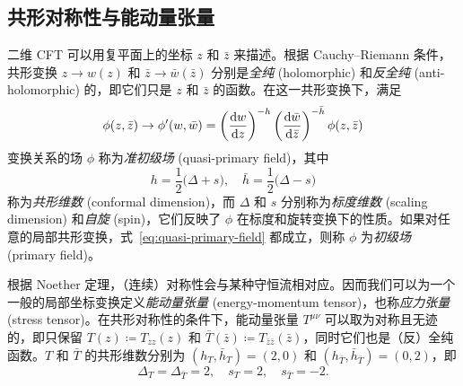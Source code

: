 \subsection{共形对称性与能动量张量}

二维 CFT 可以用复平面上的坐标 $z$ 和 $\bar{z}$ 来描述。根据 Cauchy--Riemann 条件，共形变换 $z\to w(z)$ 和 $\bar{z}\to\bar{w}(\bar{z})$ 分别是\emph{全纯} (holomorphic) 和\emph{反全纯} (anti-holomorphic) 的，即它们只是 $z$ 和 $\bar{z}$ 的函数。在这一共形变换下，满足
\begin{equation}
  \phi(z,\bar{z}) \to \phi'(w,\bar{w}) =
  \left( \frac{\mathrm{d}w}{\mathrm{d}z} \right)^{-h} \left( \frac{\mathrm{d}\bar{w}}{\mathrm{d}\bar{z}} \right)^{-\bar{h}} \phi(z,\bar{z})
  \label{eq:quasi-primary-field}
\end{equation}
变换关系的场 $\phi$ 称为\emph{准初级场} (quasi-primary field)，其中
\begin{equation}
  h = \frac12 \bigl( \Delta+s \bigr), \quad \bar{h} = \frac12 \bigl( \Delta-s \bigr)
\end{equation}
称为\emph{共形维数} (conformal dimension)，而 $\Delta$ 和 $s$ 分别称为\emph{标度维数} (scaling dimension) 和\emph{自旋} (spin)，它们反映了 $\phi$ 在标度和旋转变换下的性质。如果对任意的局部共形变换，式~\eqref{eq:quasi-primary-field} 都成立，则称 $\phi$ 为\emph{初级场} (primary field)。

根据 Noether 定理，（连续）对称性会与某种守恒流相对应。因而我们可以为一个一般的局部坐标变换定义\emph{能动量张量} (energy-momentum tensor)，也称\emph{应力张量} (stress tensor)。在共形对称性的条件下，能动量张量 $T^{\mu\nu}$ 可以取为对称且无迹的，即只保留 $T(z)\coloneq T_{zz}(z)$ 和 $\bar{T}(\bar{z})\coloneq T_{\bar{z}\bar{z}}(\bar{z})$，同时它们也是（反）全纯函数\cite{ginsparg1988applied,cardy2010conformal,francesco2012conformal}。$T$ 和 $\bar{T}$ 的共形维数分别为 $(h_T,\bar{h}_T)=(2,0)$ 和 $(h_{\bar{T}},\bar{h}_{\bar{T}})=(0,2)$，即
\begin{equation}
  \Delta_T = \Delta_{\bar{T}} = 2, \quad s_T = 2, \quad s_{\bar{T}} = -2.
\end{equation}


